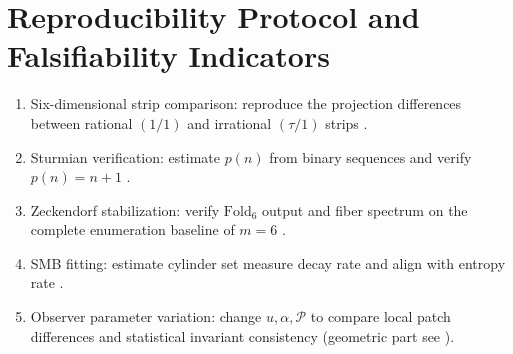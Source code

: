 \section{Reproducibility Protocol and Falsifiability Indicators}

\begin{enumerate}
  \item Six-dimensional strip comparison: reproduce the projection differences between rational $(1/1)$ and irrational $(\tau/1)$ strips \cite{PRB46_6091}.
  \item Sturmian verification: estimate $p(n)$ from binary sequences and verify $p(n)=n+1$ \cite{CambridgeSturmianWordsLothaire}.
  \item Zeckendorf stabilization: verify $\mathrm{Fold}_6$ output and fiber spectrum on the complete enumeration baseline of $m=6$ \cite{PlanetMathZeckendorfCombinatorial}.
  \item SMB fitting: estimate cylinder set measure decay rate and align with entropy rate \cite{GatechSMB}.
  \item Observer parameter variation: change $u,\alpha,\mathcal{P}$ to compare local patch differences and statistical invariant consistency (geometric part see \cite{IUCRAcceptanceDomain}).
\end{enumerate}
